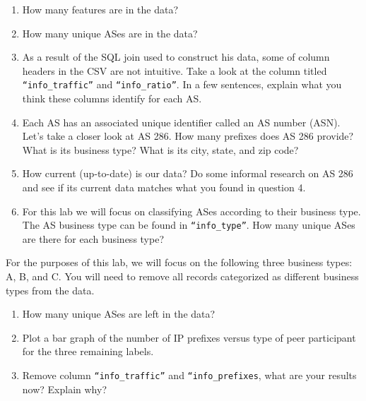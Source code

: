 \documentclass[11pt]{article}
\begin{document}
\begin{enumerate}

\item How many features are in the data?

\item How many unique ASes are in the data?

\item As a result of the SQL join used to construct his data, some of column headers in the CSV are not intuitive.  Take a look at the column titled \verb|“info_traffic”| and \verb|“info_ratio”|.  
In a few sentences, explain what you think these columns identify for each AS.

\item Each AS has an associated unique identifier called an AS number (ASN).  Let’s take a closer look at AS 286.  How many prefixes does AS 286 provide?  What is its business type?  What is its city, state, and zip code?

\item How current (up-to-date) is our data?  Do some informal research on AS 286 and see if its current data matches what you found in question 4.

\item For this lab we will focus on classifying ASes according to their business type.  The AS business type can be found in \verb|“info_type”|.  How many unique ASes are there for each business type?  
\end{enumerate}

\begin{flushleft}
For the purposes of this lab, we will focus on the following three business types:  A, B, and C.  You will need to remove all records categorized as different business types from the data.
\end{flushleft}

\begin{enumerate}[resume]
\item How many unique ASes are left in the data?

\item Plot a bar graph of the number of IP prefixes versus type of peer participant for the three remaining labels.

\item Remove column \verb|“info_traffic”| and \verb|“info_prefixes|, what are your results now?  Explain why?
\end{enumerate}
\end{document}
